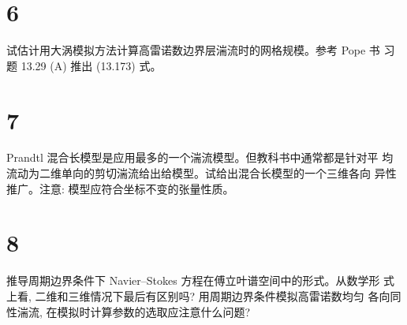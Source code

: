 \documentclass[12pt,a4]{ctexart}
\begin{document}
\section{6}

试估计用大涡模拟方法计算高雷诺数边界层湍流时的网格规模。参考 Pope 书
习题 13.29 (A) 推出 (13.173) 式。


\section{7}

Prandtl 混合长模型是应用最多的一个湍流模型。但教科书中通常都是针对平
均流动为二维单向的剪切湍流给出给模型。试给出混合长模型的一个三维各向
异性推广。注意: 模型应符合坐标不变的张量性质。


\section{8}

推导周期边界条件下 Navier--Stokes 方程在傅立叶谱空间中的形式。从数学形 式上看, 二维和三维情况下最后有区别吗? 用周期边界条件模拟高雷诺数均匀 各向同性湍流, 在模拟时计算参数的选取应注意什么问题?













\end{document}
